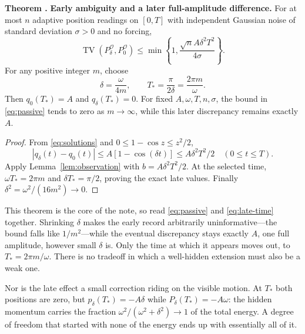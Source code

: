 \documentclass[10pt]{article}
\newcounter{claim}
\newcommand{\claim}[2]{\refstepcounter{claim}\label{#1}\textbf{#2 \theclaim.}}
\newcommand{\TV}{\operatorname{TV}}
\newcommand{\obs}{\mathcal O}
\begin{document}
\begin{resultbox}
\claim{thm:passive}{Theorem} \textbf{Early ambiguity and a later full-amplitude difference.}
For at most $n$ adaptive position readings on $[0,T]$ with independent Gaussian
noise of standard deviation $\sigma>0$ and no forcing,
\begin{equation}
\TV(P_\delta^{\obs},P_0^{\obs})
\leq\min\!\left\{1,\frac{\sqrt n A\delta^2T^2}{4\sigma}\right\}.
\label{eq:passive}
\end{equation}
For any positive integer $m$, choose
\begin{equation}
\delta=\frac{\omega}{4m},\qquad
T_* = \frac{\pi}{2\delta}=\frac{2\pi m}{\omega}.
\label{eq:late-time}
\end{equation}
Then $q_0(T_*)=A$ and $q_\delta(T_*)=0$. For fixed
$A,\omega,T,n,\sigma$, the bound in \eqref{eq:passive} tends to zero as
$m\to\infty$, while this later discrepancy remains exactly $A$.
\end{resultbox}
\begin{proof}
From \eqref{eq:solutions} and $0\leq1-\cos z\leq z^2/2$,
\[
|q_\delta(t)-q_0(t)|
\leq A[1-\cos(\delta t)]\leq A\delta^2T^2/2
\quad(0\leq t\leq T).
\]
Apply Lemma~\ref{lem:observation} with $b=A\delta^2T^2/2$. At the selected
time, $\omega T_*=2\pi m$ and $\delta T_*=\pi/2$, proving the exact late
values. Finally $\delta^2=\omega^2/(16m^2)\to0$.
\end{proof}

This theorem is the core of the note, so read \eqref{eq:passive} and
\eqref{eq:late-time} together. Shrinking $\delta$ makes the early record
arbitrarily uninformative---the bound falls like $1/m^2$---while the eventual
discrepancy stays exactly $A$, one full amplitude, however small $\delta$ is.
Only the time at which it appears moves out, to $T_*=2\pi m/\omega$. There is no
tradeoff in which a well-hidden extension must also be a weak one.

Nor is the late effect a small correction riding on the visible motion. At
$T_*$ both positions are zero, but $p_\delta(T_*)=-A\delta$ while
$P_\delta(T_*)=-A\omega$: the hidden momentum carries the fraction
$\omega^2/(\omega^2+\delta^2)\to1$ of the total energy. A degree of freedom that
started with none of the energy ends up with essentially all of it.
\end{document}
